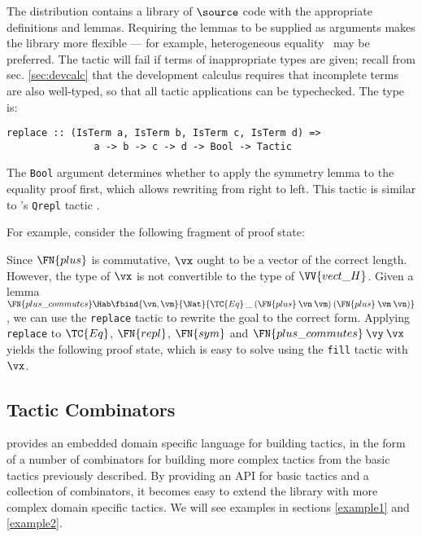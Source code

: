 The \Ivor{} distribution contains a library of $\source$ code with the
appropriate definitions and lemmas. Requiring the lemmas to be
supplied as arguments makes the library more flexible --- for example,
heterogeneous equality~\cite{mcbride-thesis} may be preferred. The
tactic will fail if terms of inappropriate types are given; recall
from sec. \ref{sec:devcalc} that the development calculus requires
that incomplete terms are also well-typed, so that all tactic
applications can be typechecked. The type is:
\begin{verbatim}
replace :: (IsTerm a, IsTerm b, IsTerm c, IsTerm d) =>
               a -> b -> c -> d -> Bool -> Tactic
\end{verbatim}
The \texttt{Bool} argument determines whether to apply the symmetry
lemma to the equality proof first, which allows rewriting from right
to left.
This  tactic is
similar to \Lego{}'s \texttt{Qrepl} tactic \cite{lego-manual}.

For example, consider the following fragment of proof state:


Since $\FN{plus}$ is commutative, $\vx$ ought to be a vector of the
correct length. However, the type of $\vx$ is not convertible to the
type of $\VV{vect\_H}$. Given a lemma $\FN{plus\_commutes}\Hab
\fbind{\vn,\vm}{\Nat}{\TC{Eq}\:\_\:(\FN{plus}\:\vn\:\vm)\:(\FN{plus}\:\vm\:\vn)}$,
we can use the \texttt{replace} tactic to rewrite the goal to the
correct form. Applying \texttt{replace} to $\TC{Eq}$, $\FN{repl}$,
$\FN{sym}$ and $\FN{plus\_commutes}\:\vy\:\vx$ yields the following
proof state, which is easy to solve using the \texttt{fill} tactic
with $\vx$.




\subsection{Tactic Combinators}

\label{combinators}

\Ivor{} provides an embedded domain specific language for
building tactics, in the form of a number of
combinators for building more complex tactics from the basic tactics
previously described. By providing an API for basic tactics and a
collection of combinators, it becomes easy to extend the library with
more complex domain specific tactics. We will see examples in
sections \ref{example1} and \ref{example2}.

